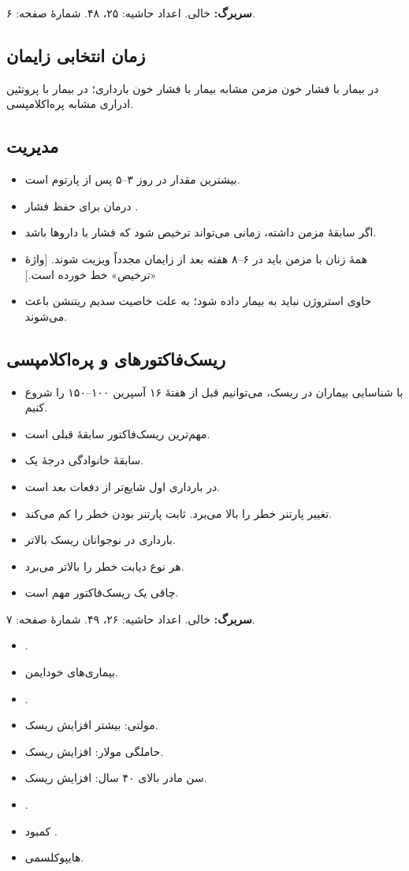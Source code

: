 \documentclass[12pt,a4paper]{article}
\begin{document}
\textbf{سربرگ:}  خالی. اعداد حاشیه: ۲۵، ۴۸. شمارهٔ صفحه: ۶.
\subsection*{زمان انتخابی زایمان}
در بیمار با فشار خون مزمن مشابه بیمار با فشار خون بارداری؛ در بیمار با پروتئین ادراری مشابه پره‌اکلامپسی.
\subsection*{مدیریت }
\begin{itemize}
\item بیشترین مقدار  در روز ۳--۵ پس از پارتوم است.
\item درمان برای حفظ فشار .
\item اگر سابقهٔ  مزمن داشته، زمانی می‌تواند ترخیص شود که فشار با داروها  باشد.
\item همهٔ زنان با  مزمن باید در ۶--۸ هفته بعد از زایمان مجدداً ویزیت شوند. [واژهٔ «ترخیص» خط خورده است.]
\item {} حاوی استروژن نباید به بیمار داده شود؛ به علت خاصیت سدیم ریتنشن باعث  می‌شوند.
\end{itemize}
\subsection*{ریسک‌فاکتورهای  و پره‌اکلامپسی}
\begin{itemize}
\item با شناسایی بیماران در ریسک، می‌توانیم قبل از هفتهٔ ۱۶ آسپرین ۱۰۰--۱۵۰ را شروع کنیم.
\item مهم‌ترین ریسک‌فاکتور سابقهٔ قبلی است.
\item سابقهٔ خانوادگی درجهٔ یک.
\item در بارداری اول شایع‌تر از دفعات بعد است.
\item تغییر پارتنر خطر را بالا می‌برد.  ثابت پارتنر بودن خطر را کم می‌کند.
\item بارداری در نوجوانان ریسک بالاتر.
\item هر نوع دیابت خطر را بالاتر می‌برد.
\item چاقی یک ریسک‌فاکتور مهم است.
\end{itemize}

\textbf{سربرگ:}  خالی. اعداد حاشیه: ۲۶، ۴۹. شمارهٔ صفحه: ۷.
\begin{itemize}
\item {}.
\item بیماری‌های خودایمن.
\item {}.
\item مولتی: بیشتر افزایش ریسک.
\item حاملگی مولار: افزایش ریسک.
\item سن مادر بالای ۴۰ سال: افزایش ریسک.
\item {}.
\item کمبود .
\item هایپوکلسمی.
\end{itemize}
\end{document}
